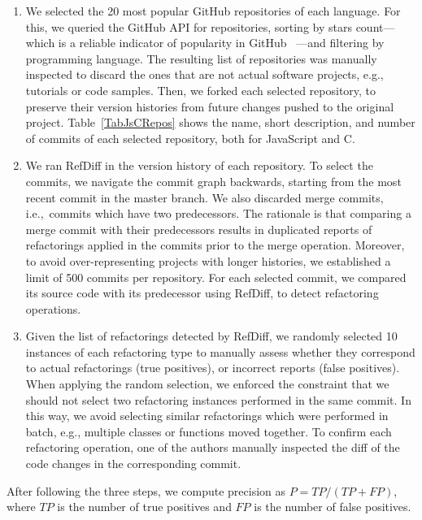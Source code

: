 \begin{enumerate}  
\item We selected the 20 most popular GitHub repositories of each language. For this, we queried the GitHub API for repositories, sorting by stars count---which is a reliable indicator of popularity in GitHub~\cite{icsme2016,jss-2018-github-stars} ---and filtering by programming language.
The resulting list of repositories was manually inspected to discard the ones that are not actual software projects, e.g., tutorials or code samples. Then, we forked each selected repository, to preserve their version histories from future changes pushed to the original project. Table~\ref{TabJsCRepos} shows the name, short description, and number of commits of each selected repository, both for JavaScript and C.

\item We ran RefDiff in the version history of each repository. To select the commits, we navigate the commit graph backwards, starting from the most recent commit in the master branch. We also discarded merge commits, i.e.,~commits which have two predecessors. The rationale is that comparing a merge commit with their predecessors results in duplicated reports of refactorings applied in the commits prior to the merge operation. Moreover, to avoid over-representing projects with longer histories, we established a limit of 500 commits per repository. For each selected commit, we compared its source code with its predecessor using RefDiff, to detect refactoring operations.

\item Given the list of refactorings detected by RefDiff, we randomly selected 10 instances of each refactoring type to manually assess whether they correspond to actual refactorings (true positives), or incorrect reports (false positives).
When applying the random selection, we enforced the constraint that we should not select two refactoring instances performed in the same commit.
In this way, we avoid selecting similar refactorings which were performed in batch, e.g., multiple classes or functions moved together.
To confirm each refactoring operation, one of the authors manually inspected the diff of the code changes in the corresponding commit.
\end{enumerate}

After following the three steps, we compute precision as $P = \mathit{TP} / (\mathit{TP} + \mathit{FP})$, where $\mathit{TP}$ is the number of true positives and $\mathit{FP}$ is the number of false positives.




